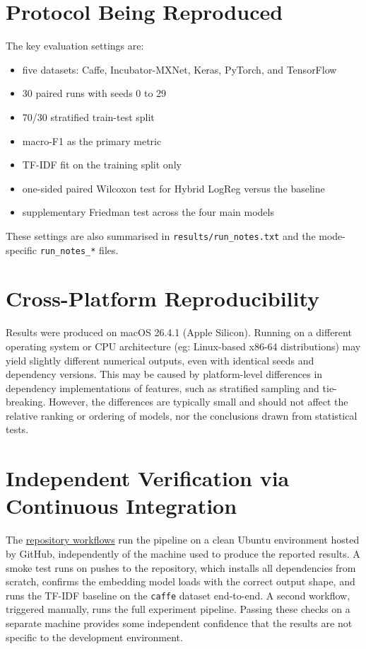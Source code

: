 \documentclass[10pt,a4paper]{article}
\begin{document}
\section{Protocol Being Reproduced}
The key evaluation settings are:
\begin{itemize}
    \item five datasets: Caffe, Incubator-MXNet, Keras, PyTorch, and TensorFlow
    \item 30 paired runs with seeds 0 to 29
    \item 70/30 stratified train-test split
    \item macro-F1 as the primary metric
    \item TF-IDF fit on the training split only
    \item one-sided paired Wilcoxon test for Hybrid LogReg versus the baseline
    \item supplementary Friedman test across the four main models
\end{itemize}
These settings are also summarised in \texttt{results/run\_notes.txt} and the mode-specific \texttt{run\_notes\_*} files.


\section{Cross-Platform Reproducibility}

Results were produced on macOS 26.4.1 (Apple Silicon). Running on a different operating system or CPU architecture (eg: Linux-based x86-64 distributions) may yield slightly different numerical outputs, even with identical seeds and dependency versions. This may be caused by platform-level differences in dependency implementations of features, such as stratified sampling and tie-breaking. However, the differences are typically small and should not affect the relative ranking or ordering of models, nor the conclusions drawn from statistical tests.


\section{Independent Verification via Continuous Integration}

The \href{https://github.com/siddharth-shringarpure/semlex/tree/main/.github/workflows}{repository workflows} run the pipeline on a clean Ubuntu environment hosted by GitHub, independently of the machine used to produce the reported results. A smoke test runs on pushes to the repository, which installs all dependencies from scratch, confirms the embedding model loads with the correct output shape, and runs the TF-IDF baseline on the \texttt{caffe} dataset end-to-end. A second workflow, triggered manually, runs the full experiment pipeline. Passing these checks on a separate machine provides some independent confidence that the results are not specific to the development environment.
\end{document}
